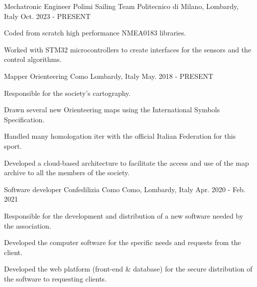 

\begin{cventries}

  \cventry
  {Mechatronic Engineer} %
  {Polimi Sailing Team} %
  {Politecnico di Milano, Lombardy, Italy} %
  {Oct. 2023 - PRESENT} %
  {
    \begin{cvitems} %
      \item {Coded from scratch high performance NMEA0183 libraries.}
      \item {Worked with STM32 microcontrollers to create interfaces for the sensors and the control algorithms.}
    \end{cvitems}
  }

  \cventry
  {Mapper} %
  {Orienteering Como} %
  {Lombardy, Italy} %
  {May. 2018 - PRESENT} %
  {
    \begin{cvitems} %
      \item {Responsible for the society's cartography.}
      \item {Drawn several new Orienteering maps using the International Symbols Specification.}
      \item {Handled many homologation iter with the official Italian Federation for this sport.}
      \item {Developed a cloud-based architecture to facilitate the access and use of the map archive to all the members of the society.}
    \end{cvitems}
  }

  \cventry
  {Software developer} %
  {Confedilizia Como} %
  {Como, Lombardy, Italy} %
  {Apr. 2020 - Feb. 2021} %
  {
    \begin{cvitems} %
      \item {Responsible for the development and distribution of a new software needed by the association.}
      \item {Developed the computer software for the specific needs and requests from the client.}
      \item {Developed the web platform (front-end \& database) for the secure distribution of the software to requesting clients.}
    \end{cvitems}
  }


\end{cventries}
